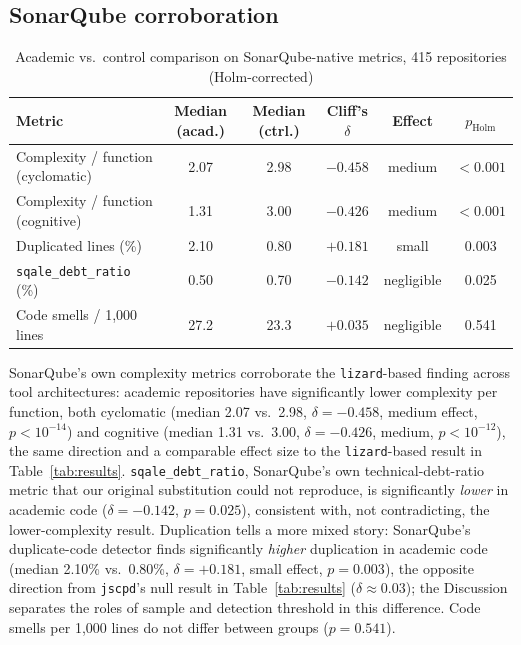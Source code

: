 \documentclass{cleiej}
\begin{document}
\subsection{SonarQube corroboration}

\begin{table}[h]
\centering
\caption{Academic vs.\ control comparison on SonarQube-native metrics, 415 repositories (Holm-corrected)}
\label{tab:sonarqube}
\begin{tabular}{lccccc}
\toprule
Metric & Median (acad.) & Median (ctrl.) & Cliff's $\delta$ & Effect & $p_{\text{Holm}}$ \\
\midrule
Complexity / function (cyclomatic) & 2.07 & 2.98 & $-0.458$ & medium & $<0.001$ \\
Complexity / function (cognitive)  & 1.31 & 3.00 & $-0.426$ & medium & $<0.001$ \\
Duplicated lines (\%)              & 2.10 & 0.80 & $+0.181$ & small  & 0.003 \\
\texttt{sqale\_debt\_ratio} (\%)   & 0.50 & 0.70 & $-0.142$ & negligible & 0.025 \\
Code smells / 1{,}000 lines        & 27.2 & 23.3 & $+0.035$ & negligible & 0.541 \\
\bottomrule
\end{tabular}
\end{table}

SonarQube's own complexity metrics corroborate the \texttt{lizard}-based finding across tool architectures: academic repositories have significantly lower complexity per function, both cyclomatic (median 2.07 vs.\ 2.98, $\delta=-0.458$, medium effect, $p<10^{-14}$) and cognitive (median 1.31 vs.\ 3.00, $\delta=-0.426$, medium, $p<10^{-12}$), the same direction and a comparable effect size to the \texttt{lizard}-based result in Table~\ref{tab:results}. \texttt{sqale\_debt\_ratio}, SonarQube's own technical-debt-ratio metric that our original substitution could not reproduce, is significantly \emph{lower} in academic code ($\delta=-0.142$, $p=0.025$), consistent with, not contradicting, the lower-complexity result. Duplication tells a more mixed story: SonarQube's duplicate-code detector finds significantly \emph{higher} duplication in academic code (median 2.10\% vs.\ 0.80\%, $\delta=+0.181$, small effect, $p=0.003$), the opposite direction from \texttt{jscpd}'s null result in Table~\ref{tab:results} ($\delta\approx0.03$); the Discussion separates the roles of sample and detection threshold in this difference. Code smells per 1,000 lines do not differ between groups ($p=0.541$).
\end{document}

